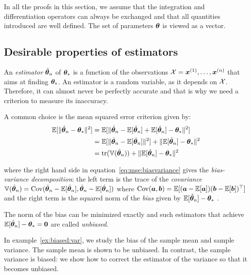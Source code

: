 In all the proofs in this section, we assume that the integration and
differentiation operators can always be exchanged and that all quantities
introduced are well defined. The set of parameters $\boldsymbol{\theta}$ is viewed as a
vector.

\subsection{Desirable properties of estimators}
\label{sec:desirable}
An \emph{estimator} $\hat{\boldsymbol{\theta}}_n$ of $\boldsymbol{\theta}_*$ is a function of the
observations $\mathcal{X} = \boldsymbol{x}^{(1)}, \dots, \boldsymbol{x}^{(n)}$ that aims at finding $\boldsymbol{\theta}_*$.
An estimator is a random variable, as it depends on $\mathcal{X}$. Therefore, it can almost never be perfectly accurate and that
is why we need a criterion to measure its inaccuracy.

A common choice is the mean squared error criterion given by:
\begin{align}
  \mathbb{E}[\|\hat{\boldsymbol{\theta}}_n - \boldsymbol{\theta}_*\|^2] &= \mathbb{E}[\|\hat{\boldsymbol{\theta}}_n - \mathbb{E}[\hat{\boldsymbol{\theta}}_n] + \mathbb{E}[\hat{\boldsymbol{\theta}}_n] - \boldsymbol{\theta}_*\|^2] \\
                                   &= \mathbb{E}[\|\hat{\boldsymbol{\theta}}_n - \mathbb{E}[\hat{\boldsymbol{\theta}}_n]\|^2] + \|\mathbb{E}[\hat{\boldsymbol{\theta}}_n] - \boldsymbol{\theta}_*\|^2  \\
                                         &= \mathop{\mathrm{tr}}(\mathbb{V}(\hat{\boldsymbol{\theta}}_n)) + \|\mathbb{E}[\hat{\boldsymbol{\theta}}_n] - \boldsymbol{\theta}_*\|^2 \label{eq:mse:biasvariance}
\end{align}

where the right hand side in equation~\ref{eq:mse:biasvariance} gives the
\emph{bias-variance decomposition}: the left term is the trace of the \emph{covariance} $\mathbb{V}(\hat{\boldsymbol{\theta}}_n) = \operatorname*{Cov}(\hat{\boldsymbol{\theta}}_n -
\mathbb{E}[\hat{\boldsymbol{\theta}}_n], \hat{\boldsymbol{\theta}}_n -
\mathbb{E}[\hat{\boldsymbol{\theta}}_n])$ where $\operatorname*{Cov}(\boldsymbol{a}, \boldsymbol{b}) = \mathbb{E}[(\boldsymbol{a} - \mathbb{E}[\boldsymbol{a}]) (\boldsymbol{b} -
\mathbb{E}[\boldsymbol{b}])^{\top}]$ and the right term is the squared norm of the \emph{bias} given by $\mathbb{E}[\hat{\boldsymbol{\theta}}_n] - \boldsymbol{\theta}_*$ .

The norm of the bias can be minimized exactly and such estimators that achieve $\mathbb{E}[\hat{\boldsymbol{\theta}}_n] - \boldsymbol{\theta}_* = \boldsymbol{0}$ are called \emph{unbiased}.

In example~\ref{ex:biased:var}, we study the bias of the sample mean and sample variance. The sample mean is shown to be unbiased. In
contrast, the sample variance is biased: we show how to
correct the estimator of the variance so that it becomes unbiased.

